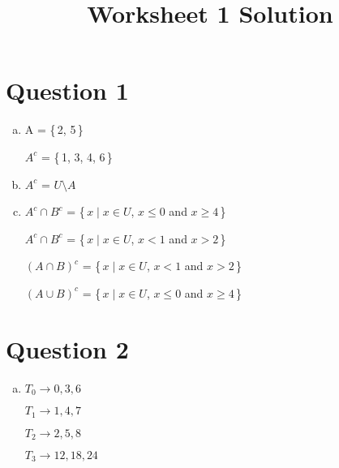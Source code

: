 \documentclass[12pt]{article}
\begin{document}
\title{Worksheet 1 Solution}
\maketitle

\section*{Question 1}

\begin{enumerate}[a)]
    \item
        A = \{\,2, 5\,\}

        $A^c$ = \{\,1, 3, 4, 6\,\}

    \bigskip

    \item
        $A^c$ = $U \setminus A$

    \bigskip

    \item
        $A^c \cap B^c$ = \{\,$x \mid x \in U$, $x \leq 0$ and $x \geq 4$\,\}

        $A^c \cap B^c$ = \{\,$x \mid x \in U$, $x < 1$ and $x > 2$\,\}

        $(A \cap B)^c$ = \{\,$x \mid x \in U$, $x < 1$ and $x > 2$\,\}

        $(A \cup B)^c$ = \{\,$x \mid x \in U$, $x \leq 0$ and $x \geq 4$\,\}
\end{enumerate}


\section*{Question 2}


\begin{enumerate}[a)]
    \item
        $T_0 \to 0,3,6 $

        $T_1 \to 1,4,7 $

        $T_2 \to 2,5,8 $

        $T_3 \to 12,18,24 $

\end{enumerate}
\end{document}
